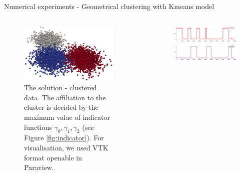 \documentclass[final,hyperref={pdfpagelabels=false}]{beamer}
\begin{document}
\begin{frame}[t]
\begin{columns}[t]
\begin{column}{.48\textwidth}
\begin{block}{Numerical experiments -  Geometrical clustering with Kmeans model}
\begin{columns}[T]
\begin{column}{0.46\linewidth}
	\begin{figure}[H]
		\begin{center}
			\includegraphics[width=1.0\linewidth, angle=0, clip = true]{figures/solution.png}
			\caption{The solution - clustered data. The affiliation to the cluster is decided by the maximum value of indicator functions $\gamma_0, \gamma_1, \gamma_2$ (see Figure \ref{fig:indicator}). For visualisation, we used VTK format openable in Paraview.
					 }
			\label{fig:kmeans_pizdaint3}	
		\end{center}
	\end{figure}
\end{column}	
\begin{column}{0.02\linewidth}\end{column}
\begin{column}{0.46\linewidth}
	\begin{figure}[H]
		\begin{center}
			\includegraphics[width=1.0\linewidth, angle=0, clip = true]{figures/gamma0.png} \\
			\includegraphics[width=1.0\linewidth, angle=0, clip = true]{figures/gamma1.png} \\

\end{center}
\end{figure}
\end{column}
\end{columns}
\end{block}
\end{column}
\end{columns}
\end{frame}
\end{document}

